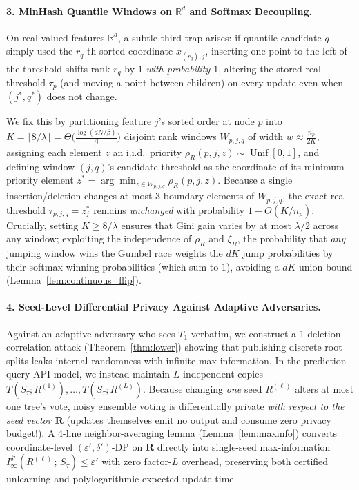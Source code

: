 \documentclass[11pt]{article}
\theoremstyle{definition}
\newcommand{\R}{\mathbb{R}}
\newcommand{\Unif}{\operatorname{Unif}}
\begin{document}
\paragraph{3. MinHash Quantile Windows on $\R^d$ and Softmax Decoupling.}
On real-valued features $\R^d$, a subtle third trap arises: if quantile candidate $q$ simply used the $r_q$-th sorted coordinate $x_{(r_q), j}$, inserting one point to the left of the threshold shifts rank $r_q$ by $1$ \emph{with probability $1$}, altering the stored real threshold $\tau_p$ (and moving a point between children) on every update even when $(j^*, q^*)$ does not change.

We fix this by partitioning feature $j$'s sorted order at node $p$ into $K = \lceil 8/\lambda \rceil = \Theta\big(\frac{\log(dN/\beta)}{\beta}\big)$ disjoint rank windows $W_{p, j, q}$ of width $w \approx \frac{n_p}{2K}$, assigning each element $z$ an i.i.d.\ priority $\rho_R(p, j, z) \sim \Unif[0,1]$, and defining window $(j,q)$'s candidate threshold as the coordinate of its minimum-priority element $z^* = \arg\min_{z \in W_{p,j,q}} \rho_R(p, j, z)$. Because a single insertion/deletion changes at most $3$ boundary elements of $W_{p,j,q}$, the exact real threshold $\tau_{p, j, q} = z^*_j$ remains \emph{unchanged} with probability $1 - O(K/n_p)$. Crucially, setting $K \ge 8/\lambda$ ensures that Gini gain varies by at most $\lambda / 2$ across any window; exploiting the independence of $\rho_R$ and $\xi_R$, the probability that \emph{any} jumping window wins the Gumbel race weights the $dK$ jump probabilities by their softmax winning probabilities (which sum to $1$), avoiding a $dK$ union bound (Lemma~\ref{lem:continuous_flip}).

\paragraph{4. Seed-Level Differential Privacy Against Adaptive Adversaries.}
Against an adaptive adversary who sees $T_1$ verbatim, we construct a 1-deletion correlation attack (Theorem~\ref{thm:lower}) showing that publishing discrete root splits leaks internal randomness with infinite max-information. In the prediction-query API model, we instead maintain $L$ independent copies $T(S_\tau; R^{(1)}), \dots, T(S_\tau; R^{(L)})$. Because changing \emph{one} seed $R^{(\ell)}$ alters at most one tree's vote, noisy ensemble voting is differentially private \emph{with respect to the seed vector $\mathbf{R}$} (updates themselves emit no output and consume zero privacy budget!). A 4-line neighbor-averaging lemma (Lemma~\ref{lem:maxinfo}) converts coordinate-level $(\varepsilon', \delta')$-DP on $\mathbf{R}$ directly into single-seed max-information $I_\infty^{\delta'}(R^{(\ell)} \,;\, S_\tau) \le \varepsilon'$ with zero factor-$L$ overhead, preserving both certified unlearning and polylogarithmic expected update time.
\end{document}
